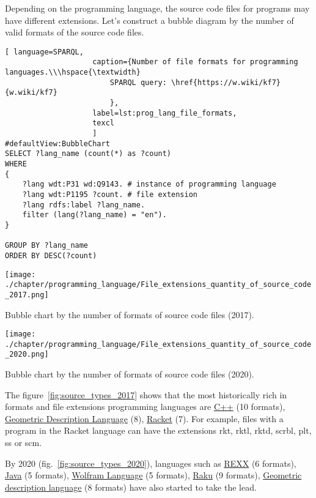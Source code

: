 Depending on the programming language, the source code files for programs may have different extensions. Let's construct a bubble diagram by the number of valid formats of the source code files.
\begin{lstlisting}[ language=SPARQL, 
                    caption={Number of file formats for programming languages.\\\hspace{\textwidth}
                        SPARQL query: \href{https://w.wiki/kf7}{w.wiki/kf7}
                        },
                    label=lst:prog_lang_file_formats,
                    texcl 
                    ]
#defaultView:BubbleChart
SELECT ?lang_name (count(*) as ?count)
WHERE
{
    ?lang wdt:P31 wd:Q9143. # instance of programming language
  	?lang wdt:P1195 ?count. # file extension
  	?lang rdfs:label ?lang_name.
    filter (lang(?lang_name) = "en").
}

GROUP BY ?lang_name 
ORDER BY DESC(?count)
\end{lstlisting}%

\begin{marginfigure}[-15cm]
	\texttt{[image: ./chapter/programming\_language/File\_extensions\_quantity\_of\_source\_code\_2017.png]}
	\caption{Bubble chart by the number of formats of source code files (2017).}
	\label{fig:source_types_2017}
\end{marginfigure}
\begin{marginfigure}[-3cm]
	\texttt{[image: ./chapter/programming\_language/File\_extensions\_quantity\_of\_source\_code\_2020.png]}
	\caption{Bubble chart by the number of formats of source code files (2020).}
	\label{fig:source_types_2020}
\end{marginfigure}

The figure~\ref{fig:source_types_2017} shows that the most historically rich in formats and file extensions programming languages are \href{https://en.wikipedia.org/wiki/C\%2B\%2B}{C++} (10 formats), \href{https://en.wikipedia.org/wiki/Geometric_Description_Language}{Geometric Description Language} (8), \href{https://en.wikipedia.org/wiki/Racket}{Racket} (7). For example, files with a program in the Racket language can have the extensions rkt, rktl, rktd, scrbl, plt, ss or scm.

By 2020 (fig.~\ref{fig:source_types_2020}), languages such as  \href{https://en.wikipedia.org/wiki/REXX}{REXX} (6 formats), \href{https://en.wikipedia.org/wiki/Java_(programming_language)}{Java} (5 formats), \href{https://en.wikipedia.org/wiki/Wolfram_Language}{Wolfram Language} (5 formats), \href{https://en.wikipedia.org/wiki/Raku_(programming_language)}{Raku} (9 formats), \href{https://en.wikipedia.org/wiki/Geometric_Description_Language}{Geometric description language} (8 formats) have also started to take the lead.

